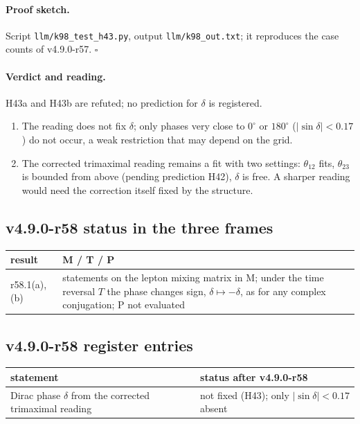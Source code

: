 \paragraph{Proof sketch.}
Script \texttt{llm/k98\_test\_h43.py}, output \texttt{llm/k98\_out.txt}; it reproduces the case counts of v4.9.0-r57.  \(\square\)

\paragraph{Verdict and reading.}
H43a and H43b are refuted; no prediction for \(\delta\) is registered.
\begin{enumerate}[leftmargin=2em]
\item The reading does not fix \(\delta\); only phases very close to \(0^\circ\) or \(180^\circ\) (\(|\sin\delta|<0.17\)) do not occur, a weak restriction that may depend on
the grid.
\item The corrected trimaximal reading remains a fit with two settings: \(\theta_{12}\) fits, \(\theta_{23}\) is bounded from above (pending prediction H42), \(\delta\) is free.  A
sharper reading would need the correction itself fixed by the structure.
\end{enumerate}

\subsection*{v4.9.0-r58 status in the three frames}
\label{subsec:v490-r58-frames}

\begin{center}
\small
\begin{tabular}{@{}>{\raggedright\arraybackslash}p{}>{\raggedright\arraybackslash}p{}@{}}
\toprule
result & M / T / P\\
\midrule
r58.1(a), (b) & statements on the lepton mixing matrix in M; under the time reversal \(T\) the phase changes sign, \(\delta\mapsto-\delta\), as for any complex conjugation; P not evaluated\\
\bottomrule
\end{tabular}
\end{center}

\subsection*{v4.9.0-r58 register entries}
\label{subsec:v490-r58-register}

\begin{center}
\small
\begin{tabular}{@{}>{\raggedright\arraybackslash}p{}>{\raggedright\arraybackslash}p{}@{}}
\toprule
statement & status after v4.9.0-r58\\
\midrule
Dirac phase \(\delta\) from the corrected trimaximal reading & not fixed (H43); only \(|\sin\delta|<0.17\) absent\\
\bottomrule
\end{tabular}
\end{center}

